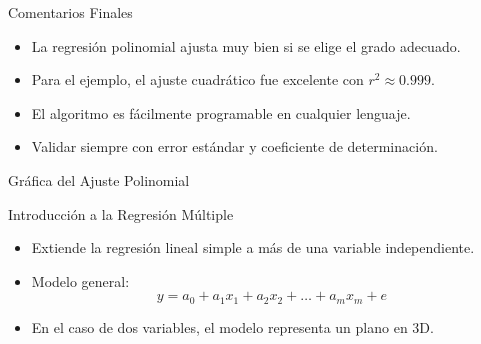 \documentclass[main.tex]{subfiles}
\begin{document}
\begin{frame}{Comentarios Finales}
  \begin{itemize}
    \item La regresión polinomial ajusta muy bien si se elige el grado adecuado.
    \item Para el ejemplo, el ajuste cuadrático fue excelente con \(r^2 \approx 0.999\).
    \item El algoritmo es fácilmente programable en cualquier lenguaje.
    \item Validar siempre con error estándar y coeficiente de determinación.
  \end{itemize}
\end{frame}
\begin{frame}{Gráfica del Ajuste Polinomial}
  \begin{center}
  \end{center}
\end{frame}


\begin{frame}{Introducción a la Regresión Múltiple}
  \begin{itemize}
    \item Extiende la regresión lineal simple a más de una variable independiente.
    \item Modelo general:
    \[
      y = a_0 + a_1 x_1 + a_2 x_2 + \dots + a_m x_m + e
    \]
    \item En el caso de dos variables, el modelo representa un plano en 3D.
  \end{itemize}
\end{frame}
\end{document}
